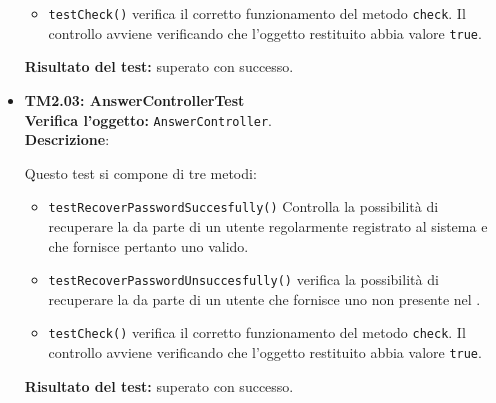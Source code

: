 \begin{itemize}
\begin{itemize}
\item \texttt{testCheck()} verifica il corretto funzionamento del metodo \texttt{check}. Il controllo avviene verificando che l'oggetto restituito abbia valore \texttt{true}.
 
\end{itemize}

\textbf{Risultato del test:} superato con successo.


\item \textbf{TM2.03: AnswerControllerTest}\\
\textbf{Verifica l'oggetto:} \texttt{AnswerController}.\\
\textbf{Descrizione}: 

Questo test si compone di tre metodi:
\begin{itemize}
\item \texttt{testRecoverPasswordSuccesfully()} 
Controlla la possibilità di recuperare la  da parte di un utente regolarmente registrato al sistema e che fornisce pertanto uno  valido.

\item \texttt{testRecoverPasswordUnsuccesfully()} 
verifica la possibilità di recuperare la  da parte di un utente che fornisce uno  non presente nel .

\item \texttt{testCheck()} verifica il corretto funzionamento del metodo \texttt{check}. Il controllo avviene verificando che l'oggetto restituito abbia valore \texttt{true}.

\end{itemize}

\textbf{Risultato del test:} superato con successo.



\end{itemize}







